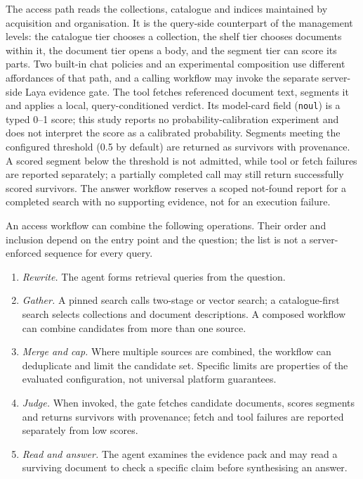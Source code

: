 \documentclass[11pt]{article}
\begin{document}
The access path reads the collections, catalogue and indices maintained by
acquisition and organisation. It is the query-side counterpart of the
management levels: the catalogue tier chooses a collection, the shelf tier
chooses documents within it, the document tier opens a body, and the segment
tier can score its parts. Two built-in chat policies and an experimental
composition use different affordances of that path, and a calling workflow may
invoke the separate server-side Laya evidence gate. The tool fetches referenced document text, segments it and applies a
local, query-conditioned verdict. Its model-card field (\texttt{noul}) is a
typed 0--1 score; this study reports no probability-calibration experiment and
does not interpret the score as a calibrated probability. Segments meeting the
configured threshold (0.5 by default) are returned as survivors with
provenance. A scored segment below the threshold is not admitted, while tool
or fetch failures are reported separately; a partially completed call may
still return successfully scored survivors. The answer workflow reserves a
scoped not-found report for a completed search with no supporting evidence,
not for an execution failure.

An access workflow can combine the following operations. Their order and
inclusion depend on the entry point and the question; the list is not a
server-enforced sequence for every query.
\begin{enumerate}
\item \emph{Rewrite.} The agent forms retrieval queries from the question.
\item \emph{Gather.} A pinned search calls two-stage or vector search; a
catalogue-first search selects collections and document descriptions. A
composed workflow can combine candidates from more than one source.
\item \emph{Merge and cap.} Where multiple sources are combined, the workflow
can deduplicate and limit the candidate set. Specific limits are properties of
the evaluated configuration, not universal platform guarantees.
\item \emph{Judge.} When invoked, the gate fetches candidate documents, scores
segments and returns survivors with provenance; fetch and tool failures are
reported separately from low scores.
\item \emph{Read and answer.} The agent examines the evidence pack and may read
a surviving document to check a specific claim before synthesising an answer.
\end{enumerate}
\end{document}
